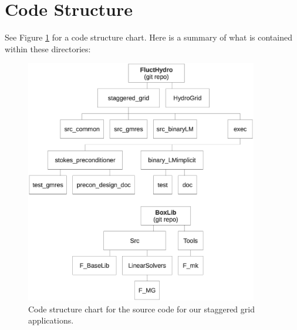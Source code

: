 \documentclass[final]{siamltex}
\begin{document}
\section{Code Structure}
See Figure \ref{fig:flowchart} for a code structure chart.  Here is a summary
of what is contained within these directories:\\
\begin{figure}[tb]
\centering
\includegraphics[width=4in]{flowchart}
\caption{Code structure chart for the source code for our staggered grid applications.}\label{fig:flowchart}
\end{figure}
\end{document}
